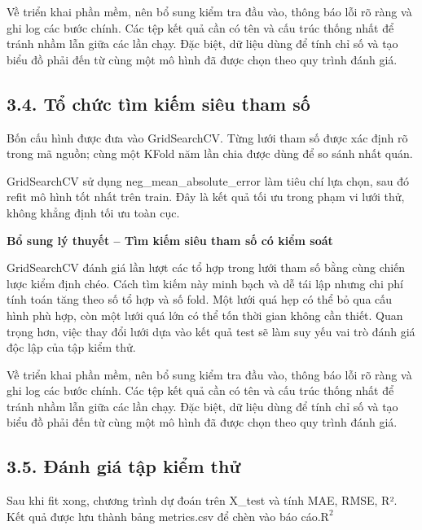 \documentclass[12pt,a4paper,oneside]{article}
\begin{document}
Về triển khai phần mềm, nên bổ sung kiểm tra đầu vào, thông báo lỗi rõ ràng và ghi log các bước chính. Các tệp kết quả cần có tên và cấu trúc thống nhất để tránh nhầm lẫn giữa các lần chạy. Đặc biệt, dữ liệu dùng để tính chỉ số và tạo biểu đồ phải đến từ cùng một mô hình đã được chọn theo quy trình đánh giá.\par

\subsection*{3.4. Tổ chức tìm kiếm siêu tham số}

Bốn cấu hình được đưa vào GridSearchCV. Từng lưới tham số được xác định
rõ trong mã nguồn; cùng một KFold năm lần chia được dùng để so sánh nhất
quán.

GridSearchCV sử dụng neg\_mean\_absolute\_error làm tiêu chí lựa chọn,
sau đó refit mô hình tốt nhất trên train. Đây là kết quả tối ưu trong
phạm vi lưới thử, không khẳng định tối ưu toàn cục.


\par\noindent\textbf{Bổ sung lý thuyết -- Tìm kiếm siêu tham số có kiểm soát}\par
GridSearchCV đánh giá lần lượt các tổ hợp trong lưới tham số bằng cùng chiến lược kiểm định chéo. Cách tìm kiếm này minh bạch và dễ tái lập nhưng chi phí tính toán tăng theo số tổ hợp và số fold. Một lưới quá hẹp có thể bỏ qua cấu hình phù hợp, còn một lưới quá lớn có thể tốn thời gian không cần thiết. Quan trọng hơn, việc thay đổi lưới dựa vào kết quả test sẽ làm suy yếu vai trò đánh giá độc lập của tập kiểm thử.\par

Về triển khai phần mềm, nên bổ sung kiểm tra đầu vào, thông báo lỗi rõ ràng và ghi log các bước chính. Các tệp kết quả cần có tên và cấu trúc thống nhất để tránh nhầm lẫn giữa các lần chạy. Đặc biệt, dữ liệu dùng để tính chỉ số và tạo biểu đồ phải đến từ cùng một mô hình đã được chọn theo quy trình đánh giá.\par

\subsection*{3.5. Đánh giá tập kiểm thử}

Sau khi fit xong, chương trình dự đoán trên X\_test và tính MAE, RMSE,
R². Kết quả được lưu thành bảng metrics.csv để chèn vào báo
cáo.\(\text{R}^{\text{2}}\)
\end{document}
